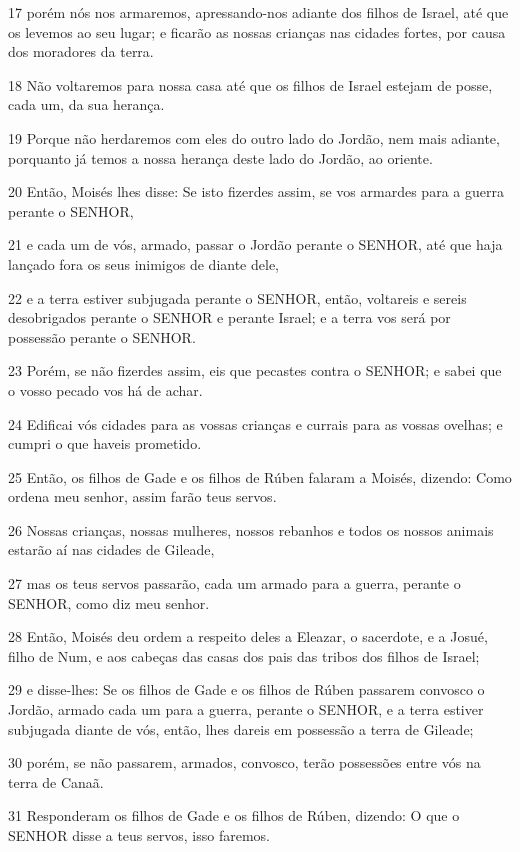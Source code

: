 \par 17 porém nós nos armaremos, apressando-nos adiante dos filhos de Israel, até que os levemos ao seu lugar; e ficarão as nossas crianças nas cidades fortes, por causa dos moradores da terra.
\par 18 Não voltaremos para nossa casa até que os filhos de Israel estejam de posse, cada um, da sua herança.
\par 19 Porque não herdaremos com eles do outro lado do Jordão, nem mais adiante, porquanto já temos a nossa herança deste lado do Jordão, ao oriente.
\par 20 Então, Moisés lhes disse: Se isto fizerdes assim, se vos armardes para a guerra perante o SENHOR,
\par 21 e cada um de vós, armado, passar o Jordão perante o SENHOR, até que haja lançado fora os seus inimigos de diante dele,
\par 22 e a terra estiver subjugada perante o SENHOR, então, voltareis e sereis desobrigados perante o SENHOR e perante Israel; e a terra vos será por possessão perante o SENHOR.
\par 23 Porém, se não fizerdes assim, eis que pecastes contra o SENHOR; e sabei que o vosso pecado vos há de achar.
\par 24 Edificai vós cidades para as vossas crianças e currais para as vossas ovelhas; e cumpri o que haveis prometido.
\par 25 Então, os filhos de Gade e os filhos de Rúben falaram a Moisés, dizendo: Como ordena meu senhor, assim farão teus servos.
\par 26 Nossas crianças, nossas mulheres, nossos rebanhos e todos os nossos animais estarão aí nas cidades de Gileade,
\par 27 mas os teus servos passarão, cada um armado para a guerra, perante o SENHOR, como diz meu senhor.
\par 28 Então, Moisés deu ordem a respeito deles a Eleazar, o sacerdote, e a Josué, filho de Num, e aos cabeças das casas dos pais das tribos dos filhos de Israel;
\par 29 e disse-lhes: Se os filhos de Gade e os filhos de Rúben passarem convosco o Jordão, armado cada um para a guerra, perante o SENHOR, e a terra estiver subjugada diante de vós, então, lhes dareis em possessão a terra de Gileade;
\par 30 porém, se não passarem, armados, convosco, terão possessões entre vós na terra de Canaã.
\par 31 Responderam os filhos de Gade e os filhos de Rúben, dizendo: O que o SENHOR disse a teus servos, isso faremos.
